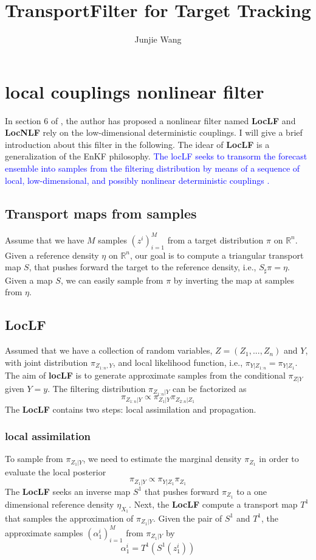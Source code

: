 \documentclass[	DIV=calc,%
							paper=letter,%
							fontsize=12pt%
                            ]{scrartcl}	 					%
\title{TransportFilter for Target Tracking}
\author{Junjie Wang }
\date{}																				%
\begin{document}
\maketitle
\tableofcontents
\section{local couplings nonlinear filter}
In  section 6 of \cite{spantini2017low}, the author has proposed a nonlinear filter named \textbf{LocLF} and \textbf{LocNLF} rely on the low-dimensional deterministic couplings. I will give a brief introduction about this filter in the following. The idear of \textbf{LocLF} is a generalization of the EnKF philosophy. \textcolor{blue}{The locLF seeks to transorm the forecast ensemble into samples from the filtering distribution by means of a sequence of local, low-dimensional, and possibly nonlinear deterministic couplings \cite{spantini2017low}.}
\subsection{Transport maps from samples}
Assume that we have $M$ samples $(z^i)_{i=1}^M$ from a target distribution $\pi$ on $\mathbb{R}^n$. Given a reference density $\eta$ on $\mathbb{R}^n$,  our goal is to compute a triangular transport map $S$, that pushes forward the target to the reference density, i.e., $S_{\sharp} \pi = \eta$. Given a map $S$, we can easily sample from $\pi$ by inverting the map at samples from $\eta$.
\subsection{LocLF}
Assumed that we have a collection of random variables, $Z = (Z_1,...,Z_n)$ and $Y$, with joint distribution $\pi_{Z_{1:n},Y}$, and local likelihood function, i.e., $\pi_{Y|Z_{1:n}} = \pi_{Y|Z_1}$.
The aim of \textbf{locLF} is to generate approximate samples from the conditional $\pi_{Z|Y}$ given $Y = y$. The filtering distribution $\pi_{Z_{1:n}|Y}$ can be factorized as
\begin{equation}
\pi_{Z_{1:n}|Y} \propto \pi_{Z_1|Y} \pi_{Z_{2:n}|Z_1}
\end{equation}
The \textbf{LocLF} contains two steps: local assimilation and propagation.
\subsubsection{local assimilation}
To sample from $\pi_{Z_1|Y}$, we need to estimate the marginal density $\pi_{Z_1}$ in order to evaluate the local posterior
\begin{equation}
\pi_{Z_1|Y} \propto \pi_{Y|Z_1} \pi_{Z_1}
\end{equation}
The \textbf{LocLF} seeks an inverse map $S^1$ that pushes forward $\pi_{Z_1}$ to a one dimensional reference density $\eta_{X_1}$. Next, the \textbf{LocLF} compute a transport map $T^1$ that samples the approximation of $\pi_{Z_1|Y}$. Given the pair of $S^1$ and $T^1$, the approximate samples $(\alpha_1^i)_{i=1}^M$ from $\pi_{Z_1|Y}$ by
\begin{equation}
\alpha_1^i = T^1(S^1(z_1^i))
\end{equation}
\end{document}
